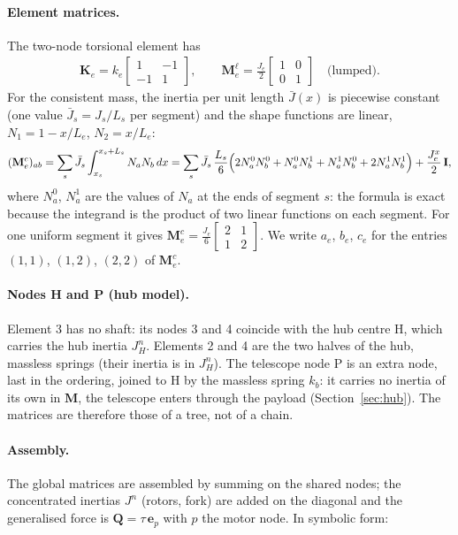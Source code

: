 \documentclass[10pt,a4paper]{article}
\numberwithin{equation}{section}
\begin{document}
\paragraph{Element matrices.} The two-node torsional element has
\begin{gather}
\mathbf K_e = k_e\begin{bmatrix}1&-1\\-1&1\end{bmatrix}, \qquad
\mathbf M_e^{\ell} = \frac{J_e}{2}\begin{bmatrix}1&0\\0&1\end{bmatrix} \quad\text{(lumped)}.
\end{gather}
For the consistent mass, the inertia per unit length $\bar J(x)$ is piecewise constant (one value $\bar J_s = J_s/L_s$ per segment) and the shape functions are linear, $N_1 = 1 - x/L_e$, $N_2 = x/L_e$:
\begin{gather}
(\mathbf M_e^{c})_{ab} = \sum_s \bar J_s\int_{x_s}^{x_s+L_s} N_a N_b\,dx
= \sum_s \bar J_s\,\frac{L_s}{6}\Bigl(2N_a^0N_b^0 + N_a^0N_b^1 + N_a^1N_b^0 + 2N_a^1N_b^1\Bigr)
+ \frac{J^{x}_e}{2}\,\mathbf I,
\end{gather}
where $N_a^0$, $N_a^1$ are the values of $N_a$ at the ends of segment $s$: the formula is exact because the integrand is the product of two linear functions on each segment. For one uniform segment it gives $\mathbf M_e^{c} = \frac{J_e}{6}\left[\begin{smallmatrix}2&1\\1&2\end{smallmatrix}\right]$. We write $a_e$, $b_e$, $c_e$ for the entries $(1,1)$, $(1,2)$, $(2,2)$ of $\mathbf M_e^{c}$.
\paragraph{Nodes H and P (hub model).} Element 3 has no shaft: its nodes 3 and 4 coincide with the hub centre H, which carries the hub inertia $J^n_H$. Elements 2 and 4 are the two halves of the hub, massless springs (their inertia is in $J^n_H$). The telescope node P is an extra node, last in the ordering, joined to H by the massless spring $k_b$: it carries no inertia of its own in $\mathbf M$, the telescope enters through the payload (Section~\ref{sec:hub}). The matrices are therefore those of a tree, not of a chain.
\paragraph{Assembly.} The global matrices are assembled by summing on the shared nodes; the concentrated inertias $J^{n}$ (rotors, fork) are added on the diagonal and the generalised force is $\mathbf Q = \tau\,\mathbf e_p$ with $p$ the motor node. In symbolic form:
\end{document}
